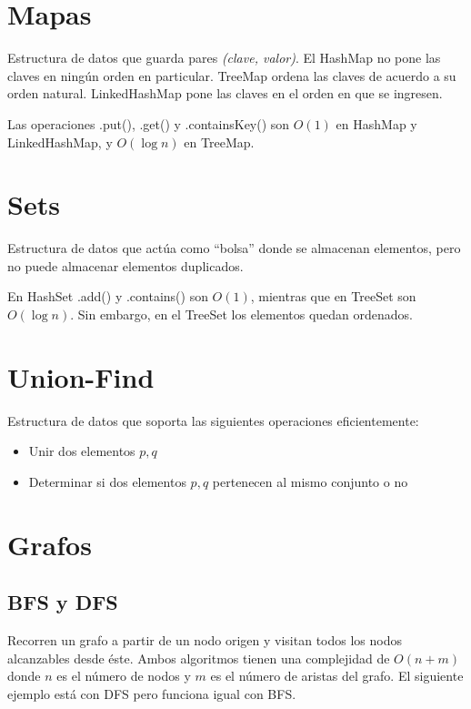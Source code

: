 \documentclass{article}
\begin{document}
\begin{multicols}{2}

\tableofcontents

\section{Mapas}
Estructura de datos que guarda pares \emph{(clave, valor)}. El HashMap no pone las claves en ningún orden en particular. TreeMap ordena las claves de acuerdo a su orden natural. LinkedHashMap pone las claves en el orden en que se ingresen.

Las operaciones .put(), .get() y .containsKey() son \( O(1) \) en HashMap y LinkedHashMap, y \( O(\log n) \) en TreeMap.


\section{Sets}
Estructura de datos que actúa como ``bolsa'' donde se almacenan elementos, pero no puede almacenar elementos duplicados.

En HashSet .add() y .contains() son \( O(1) \), mientras que en TreeSet son \( O(\log n) \). Sin embargo, en el TreeSet los elementos quedan ordenados.


\section{Union-Find}
Estructura de datos que soporta las siguientes operaciones eficientemente:
\begin{itemize}
\item Unir dos elementos \( p, q \)
\item Determinar si dos elementos \( p, q \) pertenecen al mismo conjunto o no
\end{itemize}


\section{Grafos}
	\subsection{BFS y DFS}
	Recorren un grafo a partir de un nodo origen y visitan todos los nodos alcanzables desde éste. Ambos algoritmos tienen una complejidad de \( O(n + m) \) donde \( n \) es el número de nodos y \( m \) es el número de aristas del grafo. El siguiente ejemplo está con DFS pero funciona igual con BFS.	
	


\end{multicols}
\end{document}
